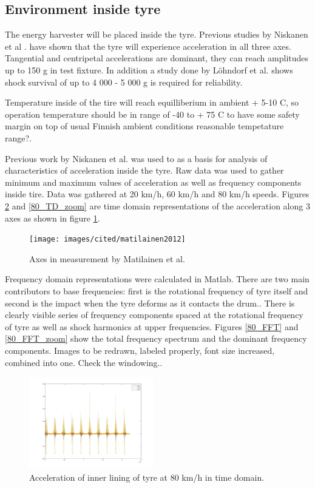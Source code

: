 \subsection{Environment inside tyre}
The energy harvester will be placed inside the tyre. Previous studies by Niskanen et al \cite{Niskanen2014}. have shown that the tyre will experience acceleration in all three axes. Tangential and centripetal accelerations are dominant, they can reach amplitudes up to 150 g in test fixture. In addition a study done by Löhndorf et al. \cite{Lohndorf2007} shows shock survival of up to 4 000 - 5 000 g is required for reliability. 

Temperature inside of the tire will reach equilliberium in ambient + 5-10 \degree C, so operation temperature should be in range of -40 to + 75 \degree C to have some safety margin on top of usual Finnish ambient conditions {\color{red} reasonable tempetature range?}.

Previous work by Niskanen et al. \cite{Niskanen2014} was used to as a basis for analysis of characteristics of acceleration inside the tyre. Raw data was used to gather minimum and maximum values of acceleration as well as frequency components inside tire. Data was gathered at 20 km/h, 60 km/h and 80 km/h speeds. Figures \ref{80_TD} and \ref{80_TD_zoom} are time domain representations of the acceleration along 3 axes as shown in figure \ref{tyre_axes}.

\begin{figure}[htb]
\begin{center}
\texttt{[image: images/cited/matilainen2012]}
\end{center}
\caption{Axes in measurement by Matilainen et al. \cite{Matilainen2012}}
\label{tyre_axes}
\end{figure}

Frequency domain representations were calculated in Matlab. There are two main contributors to base frequencies: first is the rotational frequency of tyre itself and second is the impact when the tyre deforms as it contacts the drum.. There is clearly visible series of frequency components spaced at the rotational frequency of tyre as well as shock harmonics at upper frequencies. Figures \ref{80_FFT} and \ref{80_FFT_zoom} show the total frequency spectrum and the dominant frequency components. {\color{red} Images to be redrawn, labeled properly, font size increased, combined into one. Check the windowing.}.

\begin{figure}[htb]
\begin{center}
\includegraphics[height=4cm]{images/80kmh_timedomain}
\end{center}
\caption{Acceleration of inner lining of tyre at 80 km/h in time domain.}
\label{80_TD}
\end{figure}

